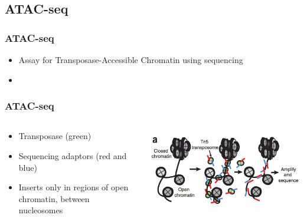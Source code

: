 \documentclass[14pt]{beamer}
\begin{document}
\subsection{ATAC-seq}

\begin{frame}
\frametitle{ATAC-seq}
\begin{itemize}
	\item<+-> Assay for Transposase-Accessible Chromatin using sequencing
	\item<+->  
\end{itemize}
\end{frame}

\begin{frame}
\frametitle{ATAC-seq}
\begin{columns}
	\begin{column}{0.6\textwidth}
		\begin{itemize}
			\item<+-> Transposase (green)
			\item<+-> Sequencing adaptors (red and blue)
			\item<+-> Inserts only in regions of open chromatin, between nucleosomes
		\end{itemize}
		\end{column}
	\begin{column}{0.4\textwidth}
		\begin{center}
     		\includegraphics[width=1\textwidth]{images_20170926_ATACsmall.png}
     	\end{center}
	\end{column}
\end{columns}
\end{frame}
\end{document}
